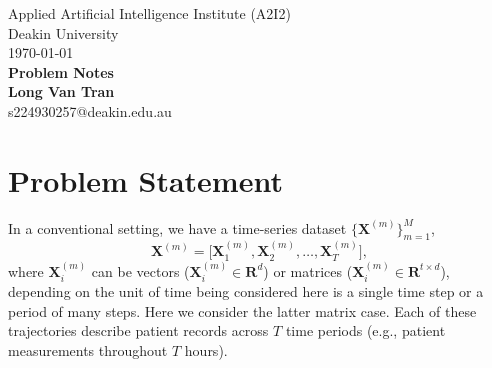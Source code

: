 \documentclass[a4paper, 11pt]{article}
\begin{document}
\begin{sloppypar}
\begin{center}
Applied Artificial Intelligence Institute (A2I2)\\
Deakin University\\
\today\\[24pt]
\LARGE
\textbf{Problem Notes}\\[6pt]
\small
\textbf {Long Van Tran}\\[6pt]
s224930257@deakin.edu.au\\[6pt]
\end{center}





\section{Problem Statement}\label{s:1}
In a conventional setting, we have a time-series dataset $\{\mathbf{X}^{(m)}\}_{m=1}^M$,
\[
\mathbf{X}^{(m)} 
= 
\bigl[\mathbf{X}_{1}^{(m)}, \mathbf{X}_{2}^{(m)}, \ldots, \mathbf{X}_{T}^{(m)}\bigr],
\]
where $\mathbf{X}_{i}^{(m)}$ can be vectors ($\mathbf{X}_{i}^{(m)} \in \mathbf{R}^d$) or matrices
($\mathbf{X}_{i}^{(m)} \in \mathbf{R}^{t \times d}$), depending on the unit of time being considered
here is a single time step or a period of many steps. Here we consider the latter matrix case.
Each of these trajectories describe patient records across \(T\) time periods
(e.g., patient measurements throughout \(T\) hours).


\end{sloppypar}
\end{document}
